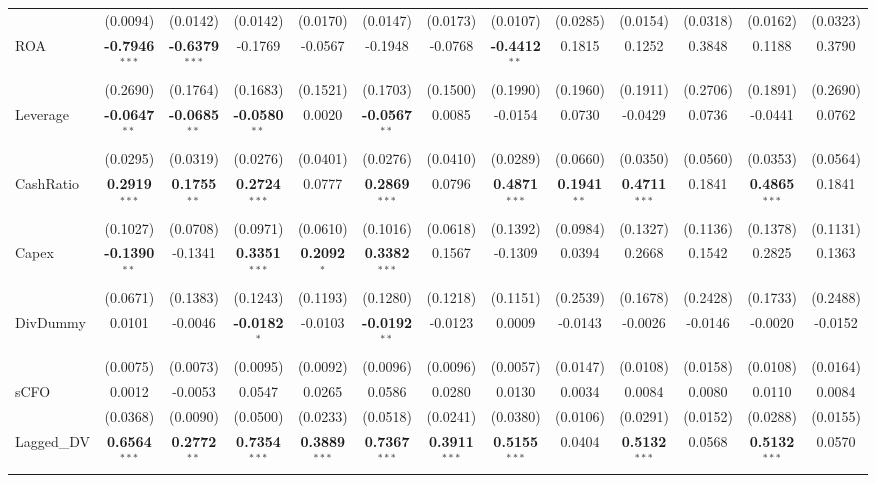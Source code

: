 \begin{landscape}
\begin{table}[H]
\begin{tabular}{lcccccccccccc}
 & (0.0094) & (0.0142) & (0.0142) & (0.0170) & (0.0147) & (0.0173) & (0.0107) & (0.0285) & (0.0154) & (0.0318) & (0.0162) & (0.0323) \\
ROA & \textbf{-0.7946}$^{***}$ & \textbf{-0.6379}$^{***}$ & -0.1769 & -0.0567 & -0.1948 & -0.0768 & \textbf{-0.4412}$^{**}$ & 0.1815 & 0.1252 & 0.3848 & 0.1188 & 0.3790 \\
 & (0.2690) & (0.1764) & (0.1683) & (0.1521) & (0.1703) & (0.1500) & (0.1990) & (0.1960) & (0.1911) & (0.2706) & (0.1891) & (0.2690) \\
Leverage & \textbf{-0.0647}$^{**}$ & \textbf{-0.0685}$^{**}$ & \textbf{-0.0580}$^{**}$ & 0.0020 & \textbf{-0.0567}$^{**}$ & 0.0085 & -0.0154 & 0.0730 & -0.0429 & 0.0736 & -0.0441 & 0.0762 \\
 & (0.0295) & (0.0319) & (0.0276) & (0.0401) & (0.0276) & (0.0410) & (0.0289) & (0.0660) & (0.0350) & (0.0560) & (0.0353) & (0.0564) \\
CashRatio & \textbf{0.2919}$^{***}$ & \textbf{0.1755}$^{**}$ & \textbf{0.2724}$^{***}$ & 0.0777 & \textbf{0.2869}$^{***}$ & 0.0796 & \textbf{0.4871}$^{***}$ & \textbf{0.1941}$^{**}$ & \textbf{0.4711}$^{***}$ & 0.1841 & \textbf{0.4865}$^{***}$ & 0.1841 \\
 & (0.1027) & (0.0708) & (0.0971) & (0.0610) & (0.1016) & (0.0618) & (0.1392) & (0.0984) & (0.1327) & (0.1136) & (0.1378) & (0.1131) \\
Capex & \textbf{-0.1390}$^{**}$ & -0.1341 & \textbf{0.3351}$^{***}$ & \textbf{0.2092}$^{*}$ & \textbf{0.3382}$^{***}$ & 0.1567 & -0.1309 & 0.0394 & 0.2668 & 0.1542 & 0.2825 & 0.1363 \\
 & (0.0671) & (0.1383) & (0.1243) & (0.1193) & (0.1280) & (0.1218) & (0.1151) & (0.2539) & (0.1678) & (0.2428) & (0.1733) & (0.2488) \\
DivDummy & 0.0101 & -0.0046 & \textbf{-0.0182}$^{*}$ & -0.0103 & \textbf{-0.0192}$^{**}$ & -0.0123 & 0.0009 & -0.0143 & -0.0026 & -0.0146 & -0.0020 & -0.0152 \\
 & (0.0075) & (0.0073) & (0.0095) & (0.0092) & (0.0096) & (0.0096) & (0.0057) & (0.0147) & (0.0108) & (0.0158) & (0.0108) & (0.0164) \\
sCFO & 0.0012 & -0.0053 & 0.0547 & 0.0265 & 0.0586 & 0.0280 & 0.0130 & 0.0034 & 0.0084 & 0.0080 & 0.0110 & 0.0084 \\
 & (0.0368) & (0.0090) & (0.0500) & (0.0233) & (0.0518) & (0.0241) & (0.0380) & (0.0106) & (0.0291) & (0.0152) & (0.0288) & (0.0155) \\
Lagged\_DV & \textbf{0.6564}$^{***}$ & \textbf{0.2772}$^{**}$ & \textbf{0.7354}$^{***}$ & \textbf{0.3889}$^{***}$ & \textbf{0.7367}$^{***}$ & \textbf{0.3911}$^{***}$ & \textbf{0.5155}$^{***}$ & 0.0404 & \textbf{0.5132}$^{***}$ & 0.0568 & \textbf{0.5132}$^{***}$ & 0.0570 \\

\end{tabular}
\end{table}
\end{landscape}
